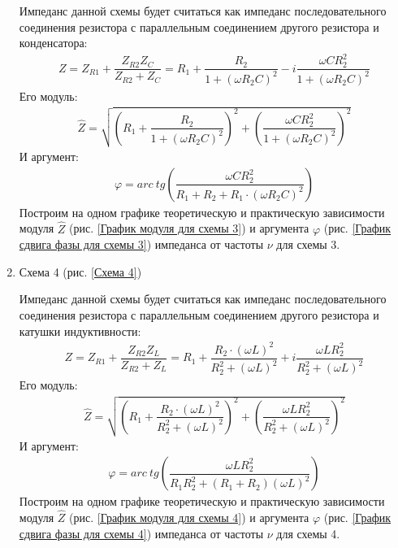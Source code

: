 \documentclass[a4paper, usenames, dvipsnames]{article}
\begin{document}
\begin{enumerate}
          Импеданс данной схемы будет считаться как импеданс
          последовательного соединения резистора
          с параллельным соединением другого резистора и конденсатора:
          \begin{gather*}
              Z = Z_{R1} + \dfrac{Z_{R2} Z_C}{Z_{R2} + Z_C} = R_1 + \dfrac{R_2}{1 + (\omega R_2 C)^2} - i\dfrac{\omega C R_2^2}{1 + (\omega R_2 C)^2}
          \end{gather*}
          Его модуль:
          \begin{gather*}
              \hat{Z} = \sqrt{\left(R_1 + \dfrac{R_2}{1 + (\omega R_2 C)^2}\right)^2 + \left(\dfrac{\omega C R_2^2}{1 + (\omega R_2 C)^2}\right)^2}
          \end{gather*}
          И аргумент:
          \begin{gather*}
              \varphi = arc\ tg\left(\dfrac{\omega C R^2_2}{R_1 + R_2 + R_1 \cdot (\omega R_2 C)^2}\right)
          \end{gather*}
          Построим на одном графике теоретическую и практическую зависимости
          модуля $\hat{Z}$ (рис. \ref{График модуля для схемы 3})
          и аргумента $\varphi$ (рис. \ref{График сдвига фазы для схемы 3})
          импеданса от частоты $\nu$ для схемы 3.
    \item Схема 4 (рис. \ref{Схема 4})

          Импеданс данной схемы будет считаться как импеданс
          последовательного соединения резистора
          с параллельным соединением другого резистора и катушки индуктивности:
          \begin{gather*}
              Z = Z_{R1} + \dfrac{Z_{R2} Z_L}{Z_{R2} + Z_L} = R_1 + \dfrac{R_2 \cdot (\omega L)^2}{R_2^2 + (\omega L)^2} + i \dfrac{\omega L R_2^2}{R_2^2 + (\omega L)^2}
          \end{gather*}
          Его модуль:
          \begin{gather*}
              \hat{Z} = \sqrt{\left(R_1 + \dfrac{R_2 \cdot (\omega L)^2}{R_2^2 + (\omega L)^2}\right)^2 + \left(\dfrac{\omega L R_2^2}{R_2^2 + (\omega L)^2}\right)^2}
          \end{gather*}
          И аргумент:
          \begin{gather*}
              \varphi = arc\ tg\left(\dfrac{\omega L R_2^2}{R_1 R_2^2 + (R_1 + R_2) (\omega L)^2}\right)
          \end{gather*}
          Построим на одном графике теоретическую и практическую зависимости
          модуля $\hat{Z}$ (рис. \ref{График модуля для схемы 4})
          и аргумента $\varphi$ (рис. \ref{График сдвига фазы для схемы 4})
          импеданса от частоты $\nu$ для схемы 4.
\end{enumerate}
\end{document}

